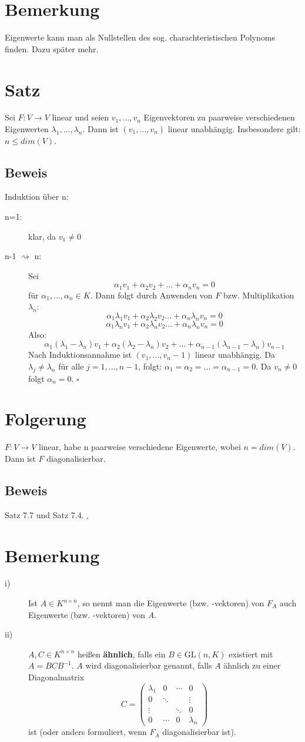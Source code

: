 \documentclass{scrbook}
\begin{document}
\section{Bemerkung}
Eigenwerte kann man als Nullstellen des sog. charachteristischen Polynoms finden. Dazu später mehr.
\section{Satz}
Sei $F:V \rightarrow V$ linear und seien $v_1,...,v_n$ Eigenvektoren zu paarweise verschiedenen Eigenwerten $\lambda_1,...,\lambda_n$. Dann ist $(v_1,...,v_n)$ linear unabhängig. Insbesondere gilt: $n \leq dim(V)$.
\subsection*{Beweis}
Induktion über n:
\begin{description}
\item[n=1:] klar, da $v_1\neq 0$
\item[n-1 $\rightsquigarrow$ n:] Sei \[\alpha_1 v_1+ \alpha_2 v_2 +...+ \alpha_n v_n = 0\] für $\alpha_1,...,\alpha_n \in K$. Dann folgt durch Anwenden von $F$ bzw. Multiplikation $\lambda_n$: \[\alpha_1\lambda_1v_1+\alpha_2\lambda_2v_2...+\alpha_n\lambda_nv_n=0\]\[\alpha_1\lambda_nv_1+\alpha_2\lambda_nv_2...+\alpha_n\lambda_nv_n=0\]
Also:\[\alpha_1(\lambda_1-\lambda_n)v_1+\alpha_2(\lambda_2-\lambda_n)v_2+...+\alpha_{n-1}(\lambda_{n-1}-\lambda_n)v_{n-1}\]
Nach Induktionsannahme ist $(v_1,...,v_n-1)$ linear unabhängig. Da $\lambda_j \neq \lambda_n$ für alle $j=1,...,n-1$, folgt: $\alpha_1=\alpha_2=...=\alpha_{n-1} = 0$. Da $v_n \neq 0$ folgt $\alpha_n=0$. $\square$
\end{description}
\section{Folgerung}
$F: V\rightarrow V$ linear, habe n paarweise verschiedene Eigenwerte, wobei $n = dim (V)$. Dann ist $F$ diagonalisierbar.
\subsection*{Beweis}
Satz 7.7 und Satz 7.4. $_\square$
\section{Bemerkung}
\begin{description}
\item[i)] Ist $A\in K^{n\times n}$, so nennt man die Eigenwerte (bzw. -vektoren) von $F_A$ auch Eigenwerte (bzw. -vektoren) von $A$.
\item[ii)] $A,C \in K^{n \times n}$ heißen \textbf{ähnlich}, falls ein $B\in $GL$(n,K)$ existiert mit $A=BCB^{-1}$. $A$ wird diagonalisierbar genannt, falls $A$ ähnlich zu einer Diagonalmatrix \[C = \left(\begin{array}{cccc}
\lambda_1&0&\cdots&0\\
0&\ddots&&\vdots\\
\vdots&&\ddots&0\\
0&\cdots&0&\lambda_n
\end{array}\right)\] ist (oder anders formuliert, wenn $F_A$ diagonalisierbar ist).
\end{description}
\end{document}
